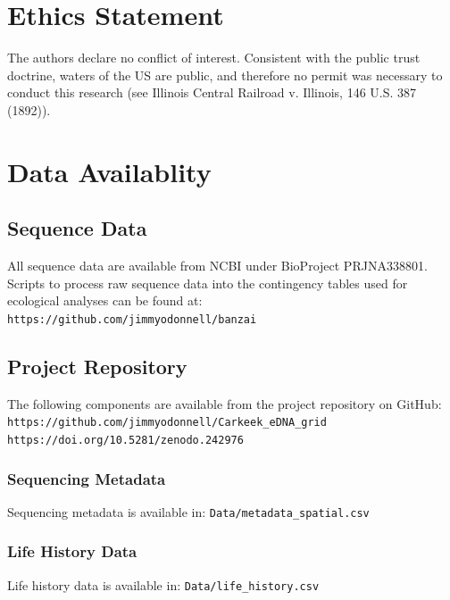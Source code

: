 \documentclass[11pt,letterpaper]{article} %
\begin{document}
\section*{Ethics Statement}
The authors declare no conflict of interest.
Consistent with the public trust doctrine, waters of the US are public, and therefore no permit was necessary to conduct this research (see Illinois Central Railroad v. Illinois, 146 U.S. 387 (1892)).

\section*{Data Availablity}
\label{data}

\subsection*{Sequence Data}
\label{sequence_data}
All sequence data are available from NCBI under BioProject PRJNA338801.\\
Scripts to process raw sequence data into the contingency tables used for ecological analyses can be found at: \\
\verb!https://github.com/jimmyodonnell/banzai!\\

\subsection*{Project Repository}
The following components are available from the project repository on GitHub: \\
\verb!https://github.com/jimmyodonnell/Carkeek_eDNA_grid!\\
\verb!https://doi.org/10.5281/zenodo.242976!

\subsubsection*{Sequencing Metadata}
\label{sequencing_metadata}
Sequencing metadata is available in: \verb!Data/metadata_spatial.csv!

\subsubsection*{Life History Data}
\label{life_history_data}
Life history data is available in: \verb!Data/life_history.csv!
\end{document}
